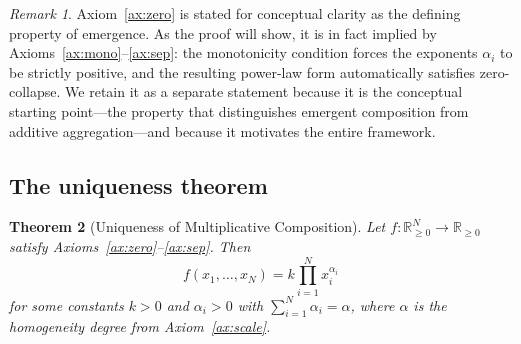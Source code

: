 \documentclass[12pt, a4paper]{article}
\newtheorem{theorem}{Theorem}[section]
\theoremstyle{definition}
\theoremstyle{remark}
\newtheorem{remark}[theorem]{Remark}
\newcommand{\Rnn}{\mathbb{R}_{\geq 0}}
\begin{document}
\begin{remark}
Axiom~\ref{ax:zero} is stated for conceptual clarity as the defining property of emergence. As the proof will show, it is in fact implied by Axioms~\ref{ax:mono}--\ref{ax:sep}: the monotonicity condition forces the exponents $\alpha_i$ to be strictly positive, and the resulting power-law form automatically satisfies zero-collapse. We retain it as a separate statement because it is the conceptual starting point---the property that distinguishes emergent composition from additive aggregation---and because it motivates the entire framework.
\end{remark}

\subsection{The uniqueness theorem}

\begin{theorem}[Uniqueness of Multiplicative Composition]\label{thm:main}
Let $f: \Rnn^N \to \Rnn$ satisfy Axioms~\ref{ax:zero}--\ref{ax:sep}. Then
\[
f(x_1, \ldots, x_N) = k \prod_{i=1}^{N} x_i^{\alpha_i}
\]
for some constants $k > 0$ and $\alpha_i > 0$ with $\sum_{i=1}^{N} \alpha_i = \alpha$, where $\alpha$ is the homogeneity degree from Axiom~\ref{ax:scale}.
\end{theorem}
\end{document}
